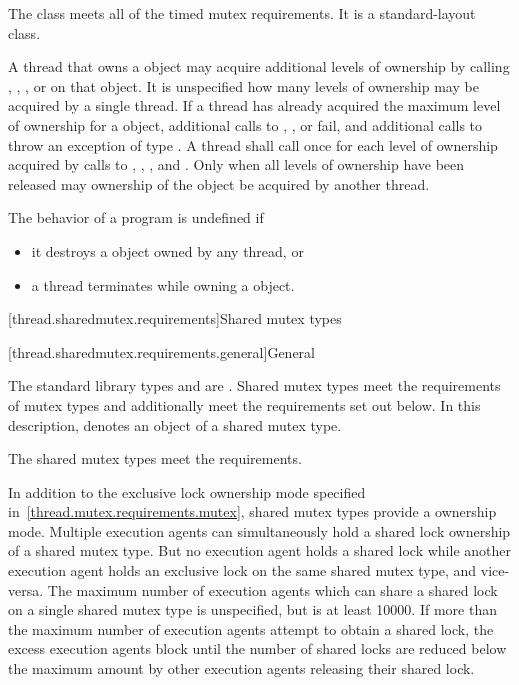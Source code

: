 \pnum
The class  meets
all of the timed mutex requirements.
It is a standard-layout class.

\pnum
A thread that owns a  object may acquire additional
levels of ownership by calling , ,
, or  on that object. It is
unspecified how many levels of ownership may be acquired by a single thread. If
a thread has already acquired the maximum level of ownership for a
 object, additional calls to ,
, or  fail, and additional
calls to  throw an exception of type . A
thread shall call  once for each level of ownership acquired by
calls to , , , and
. Only when all levels of ownership have been released
may ownership of the object be acquired by another thread.

\pnum
The behavior of a program is undefined if
\begin{itemize}
\item it destroys a  object owned by any thread, or
\item a thread terminates while owning a  object.
\end{itemize}


[thread.sharedmutex.requirements]{Shared mutex types}

[thread.sharedmutex.requirements.general]{General}

\pnum
The standard library types  and 
are . Shared mutex types meet the requirements of
mutex types and additionally
meet the requirements set out below. In this description,
 denotes an object of a shared mutex type.
\begin{note}
The shared mutex types meet the 
requirements.
\end{note}

\pnum
{}%
In addition to the exclusive lock ownership mode specified
in~\ref{thread.mutex.requirements.mutex}, shared mutex types provide a
 ownership mode. Multiple execution agents can
simultaneously hold a shared lock ownership of a shared mutex type. But no
execution agent holds a shared lock while another execution agent holds an
exclusive lock on the same shared mutex type, and vice-versa. The maximum
number of execution agents which can share a shared lock on a single shared
mutex type is unspecified, but is at least 10000. If more than the
maximum number of execution agents attempt to obtain a shared lock, the
excess execution agents block until the number of shared locks are
reduced below the maximum amount by other execution agents releasing their
shared lock.

